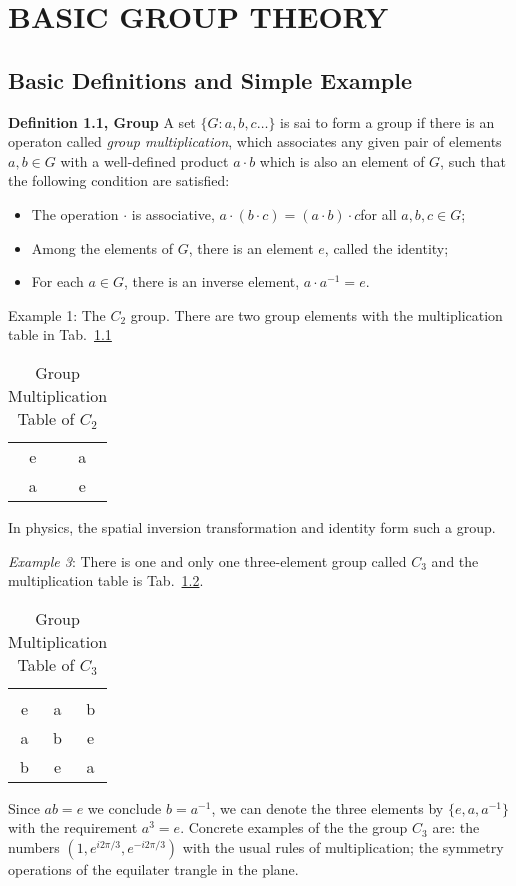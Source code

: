 \chapter{BASIC GROUP THEORY}

\section{Basic Definitions and Simple Example}
\textbf{Definition 1.1, Group} A set $\{G: a, b, c\dots\}$ is sai to form a group if there is an operaton called \textit{group multiplication}, which associates any given pair of elements $a, b \in G$ with a well-defined product $a \cdot b$ which is also an element of $G$, such that the following  condition are satisfied:
\begin{itemize}
  \item The operation $\cdot$ is associative, $a \cdot \left(b \cdot c\right) = \left(a\cdot b \right) \cdot c$for all $a, b, c \in G$;
  \item Among the elements of $G$, there is an element $e$, called the identity;
  \item For each $a \in G$, there is an inverse element, $a \cdot a^{-1}=e$.
\end{itemize}

\textrm{Example 1}: The $C_{2}$ group.
There are two group elements with the multiplication table in Tab.~\ref{tab:1-1}
\begin{table}
  \centering
  \begin{tabular}{c c}
    \hline
    e & a \\
    a & e \\
    \hline
  \end{tabular}
  \caption{Group Multiplication Table of $C_{2}$}
  \label{tab:1-1}
\end{table}
In physics, the spatial inversion transformation and identity form such a group.

\textit{Example 3}: There is one and only one three-element group called $C_{3}$ and the multiplication table is Tab.~\ref{tab:1-2}.
\begin{table}
  \centering
  \begin{tabular}{c c c}
    \hline \\
    e & a & b \\
    a & b & e \\
    b & e & a \\
    \hline
  \end{tabular}
  \caption{Group Multiplication Table of $C_3$}
  \label{tab:1-2}
\end{table}
Since $ab=e$ we conclude $b=a^{-1}$, we can denote the three elements by $\{e, a, a^{-1}\}$ with the requirement $a^{3}=e$.
Concrete examples of the the group $C_{3}$ are: the numbers $\left( 1, e^{i2\pi/3}, e^{-i2\pi/3}\right)$ with the usual rules of multiplication; the symmetry operations of the equilater trangle in the plane.

